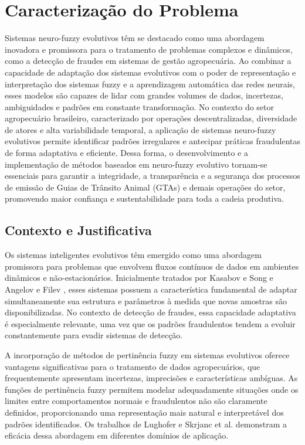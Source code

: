\chapter{Caracterização do Problema}
\label{chap:Problema}

Sistemas neuro-fuzzy evolutivos têm se destacado como uma abordagem inovadora e promissora para o tratamento de problemas complexos e dinâmicos, como a detecção de fraudes em sistemas de gestão agropecuária. Ao combinar a capacidade de adaptação dos sistemas evolutivos com o poder de representação e interpretação dos sistemas fuzzy e a aprendizagem automática das redes neurais, esses modelos são capazes de lidar com grandes volumes de dados, incertezas, ambiguidades e padrões em constante transformação. No contexto do setor agropecuário brasileiro, caracterizado por operações descentralizadas, diversidade de atores e alta variabilidade temporal, a aplicação de sistemas neuro-fuzzy evolutivos permite identificar padrões irregulares e antecipar práticas fraudulentas de forma adaptativa e eficiente. Dessa forma, o desenvolvimento e a implementação de métodos baseados em neuro-fuzzy evolutivo tornam-se essenciais para garantir a integridade, a transparência e a segurança dos processos de emissão de Guias de Trânsito Animal (GTAs) e demais operações do setor, promovendo maior confiança e sustentabilidade para toda a cadeia produtiva.

\section{Contexto e Justificativa}

Os sistemas inteligentes evolutivos têm emergido como uma abordagem promissora para problemas que envolvem fluxos contínuos de dados em ambientes dinâmicos e não-estacionários. Inicialmente tratados por Kasabov e Song \cite{kasabov-2002} e Angelov e Filev \cite{angelov-2004b}, esses sistemas possuem a característica fundamental de adaptar simultaneamente sua estrutura e parâmetros à medida que novas amostras são disponibilizadas. No contexto de detecção de fraudes, essa capacidade adaptativa é especialmente relevante, uma vez que os padrões fraudulentos tendem a evoluir constantemente para evadir sistemas de detecção.

A incorporação de métodos de pertinência fuzzy em sistemas evolutivos oferece vantagens significativas para o tratamento de dados agropecuários, que frequentemente apresentam incertezas, imprecisões e características ambíguas. As funções de pertinência fuzzy permitem modelar adequadamente situações onde os limites entre comportamentos normais e fraudulentos não são claramente definidos, proporcionando uma representação mais natural e interpretável dos padrões identificados. Os trabalhos de Lughofer \cite{Lughofer2011} e Skrjanc et al. \cite{Skrjanc2019a} demonstram a eficácia dessa abordagem em diferentes domínios de aplicação.

